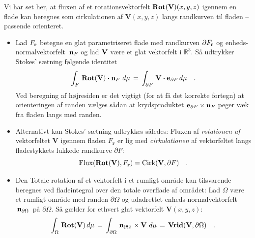 
\begin{summary}
Vi har set her, at fluxen af et rotationsvektorfelt $\operatorname{\mathbf{Rot}}(\mathbf{V})(x,y,z)$ igennem en flade kan beregnes som cirkulationen af $\mathbf{V}(x,y,z)$ langs randkurven til fladen -- passende orienteret.
\begin{itemize}
\item Lad $F_{\bf{r}}$ betegne en glat parametriseret flade
med randkurven $\partial F_{\bf{r}}$ og
en\-heds\--nor\-mal\-vek\-tor\-felt
$\,{\bf{n}}_{F}$ og lad ${\bf{V}}$ være et glat
vektorfelt i $\mathbb{R}^{3}$. Så udtrykker Stokes' sætning følgende identitet
\begin{equation}
\int_{F}\, \operatorname{\mathbf{Rot}}({\bf{V}})\bm{\cdot} {\bf{n}}_{F} \,
\,d\mu \, = \, \int_{\partial F} \, {\bf{V}}
\bm{\cdot} {\bf{e}}_{\partial F} \, d\mu \quad .
\end{equation}
Ved beregning af højresiden er det vigtigt (for at få det korrekte fortegn) at orienteringen
af randen vælges
sådan at krydsproduktet  ${\bf{e}}_{\partial F}
\times {\bf{n}}_{F}$ peger væk fra fladen langs
med randen.
\item Alternativt kan Stokes' sætning udtrykkes således: Fluxen af \emph{rotationen af} vektorfeltet $\mathbf{V}$ igennem fladen $F_{\mathbf{r}}$ er lig med \emph{cirkulationen} af vektorfeltet
langs fladestykkets lukkede randkurve  $\partial F$:
\begin{equation}
\operatorname{Flux}(\operatorname{\mathbf{Rot}}(\mathbf{V}), F_{\mathbf{r}}) = \operatorname{Cirk}(\mathbf{V}, \partial F) \quad .
\end{equation}
\item Den Totale rotation af et vektorfelt i et rumligt område kan tilsvarende beregnes ved fladeintegral over den totale overflade af området:  Lad $\Omega$ være et rumligt
område med randen $\partial \Omega$ og udadrettet
enheds-normalvektorfelt $\,{\bf{n}}_{\partial
\Omega}\,$ på $\partial \Omega$. Så gælder for ethvert glat vektorfelt $\mathbf{V}(x,y,z)$:
\begin{equation}
\int_{\Omega}\, \operatorname{\mathbf{Rot}}({\bf{V}})\, d\mu \,  = \,
\int_{\partial \Omega}\, {\bf{n}}_{\partial
\Omega}\, \times {\bf{V}}
 \, \,d\mu \, = \, {\operatorname{\bf{Vrid}}}({\bf{V}},
\partial \Omega) \quad .
\end{equation}

\end{itemize}
\end{summary}






